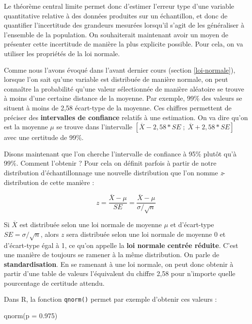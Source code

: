 \documentclass[
  french,
]{book}
\newenvironment{Shaded}{\begin{snugshade}}{\end{snugshade}}
\newcommand{\AttributeTok}[1]{\textcolor[rgb]{0.77,0.63,0.00}{#1}}
\newcommand{\FloatTok}[1]{\textcolor[rgb]{0.00,0.00,0.81}{#1}}
\newcommand{\FunctionTok}[1]{\textcolor[rgb]{0.00,0.00,0.00}{#1}}
\newcommand{\NormalTok}[1]{#1}
\begin{document}
Le théorème central limite permet donc d'estimer l'erreur type d'une variable quantitative relative à des données produites sur un échantillon, et donc de quantifier l'incertitude des grandeurs mesurées lorsqu'il s'agit de les généraliser à l'ensemble de la population. On souhaiterait maintenant avoir un moyen de présenter cette incertitude de manière la plus explicite possible. Pour cela, on va utiliser les propriétés de la loi normale.

Comme nous l'avons évoqué dans l'avant dernier cours (section \ref{loi-normale}), lorsque l'on sait qu'une variable est distribuée de manière normale, on peut connaître la probabilité qu'une valeur sélectionnée de manière aléatoire se trouve à moins d'une certaine distance de la moyenne. Par exemple, 99\% des valeurs se situent à moins de 2,58 écart-type de la moyenne. Ces chiffres permettent de préciser des \textbf{intervalles de confiance} relatifs à une estimation. On va dire qu'on est la moyenne \(\mu\) se trouve dans l'intervalle \([\overline{X}-2,58*SE \;;\; \overline{X}+2,58*SE]\) avec une certitude de 99\%.

Disons maintenant que l'on cherche l'intervalle de confiance à 95\% plutôt qu'à 99\%. Comment l'obtenir ? Pour cela on définit parfois à partir de notre distribution d'échantillonnage une nouvelle distribution que l'on nomme \emph{z}-distribution de cette manière :

\[ z = \frac{\overline{X} - \mu}{SE} = \frac{\overline{X} - \mu}{\sigma/\sqrt{n}}\]

Si \(\overline{X}\) est distribuée selon une loi normale de moyenne \(\mu\) et d'écart-type \(SE = \sigma/\sqrt{n}\), alors \(z\) sera distribuée selon une loi normale de moyenne 0 et d'écart-type égal à 1, ce qu'on appelle la \textbf{loi normale centrée réduite}. C'est une manière de toujours se ramener à la même distribution. On parle de \textbf{standardisation}. En se ramenant à une loi normale, on peut donc obtenir à partir d'une table de valeurs l'équivalent du chiffre 2,58 pour n'importe quelle pourcentage de certitude attendu.

Dans R, la fonction \texttt{qnorm()} permet par exemple d'obtenir ces valeurs :

\begin{Shaded}
\begin{Highlighting}[]
\FunctionTok{qnorm}\NormalTok{(}\AttributeTok{p =} \FloatTok{0.975}\NormalTok{)}
\end{Highlighting}
\end{Shaded}
\end{document}
